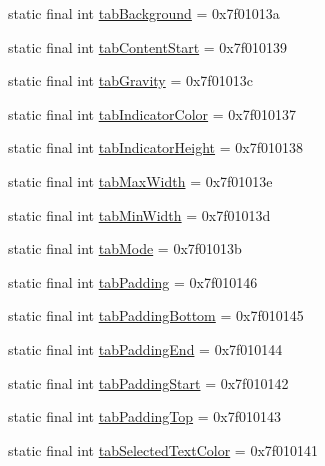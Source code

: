 \begin{CompactItemize}
\item 
static final int \hyperlink{classandroid_1_1support_1_1coreutils_1_1_r_1_1attr_3dca9b897843b4b59a01f3ad3595b9ef}{tabBackground} = 0x7f01013a
\item 
static final int \hyperlink{classandroid_1_1support_1_1coreutils_1_1_r_1_1attr_7ac66c6ab6b2d2bca042b800731a06b3}{tabContentStart} = 0x7f010139
\item 
static final int \hyperlink{classandroid_1_1support_1_1coreutils_1_1_r_1_1attr_212d311a831f8211b30aae71778489c1}{tabGravity} = 0x7f01013c
\item 
static final int \hyperlink{classandroid_1_1support_1_1coreutils_1_1_r_1_1attr_4767e58373c85c0559c5163f55a56377}{tabIndicatorColor} = 0x7f010137
\item 
static final int \hyperlink{classandroid_1_1support_1_1coreutils_1_1_r_1_1attr_16dbe4f5f9bd9bd387e2588f359b7c28}{tabIndicatorHeight} = 0x7f010138
\item 
static final int \hyperlink{classandroid_1_1support_1_1coreutils_1_1_r_1_1attr_ad5e2eb4d9bb41c77d17f5b04939f7a7}{tabMaxWidth} = 0x7f01013e
\item 
static final int \hyperlink{classandroid_1_1support_1_1coreutils_1_1_r_1_1attr_a1bb640a1055c6485ac7b83be072d00f}{tabMinWidth} = 0x7f01013d
\item 
static final int \hyperlink{classandroid_1_1support_1_1coreutils_1_1_r_1_1attr_550a98049858a613483d1385d502b133}{tabMode} = 0x7f01013b
\item 
static final int \hyperlink{classandroid_1_1support_1_1coreutils_1_1_r_1_1attr_bcc94a081acd64311c3ed87241974506}{tabPadding} = 0x7f010146
\item 
static final int \hyperlink{classandroid_1_1support_1_1coreutils_1_1_r_1_1attr_d416169e5cb21f86214b4ba8bb1869a7}{tabPaddingBottom} = 0x7f010145
\item 
static final int \hyperlink{classandroid_1_1support_1_1coreutils_1_1_r_1_1attr_9d19acc26d9d7c7844b20e679a333585}{tabPaddingEnd} = 0x7f010144
\item 
static final int \hyperlink{classandroid_1_1support_1_1coreutils_1_1_r_1_1attr_2a6441ede352f348f010fd70d58b7de6}{tabPaddingStart} = 0x7f010142
\item 
static final int \hyperlink{classandroid_1_1support_1_1coreutils_1_1_r_1_1attr_3a4fd4dd1fb23d69ed62369eb6d3840e}{tabPaddingTop} = 0x7f010143
\item 
static final int \hyperlink{classandroid_1_1support_1_1coreutils_1_1_r_1_1attr_ce33febe524bb037e5200baf4550cdbf}{tabSelectedTextColor} = 0x7f010141

\end{CompactItemize}
